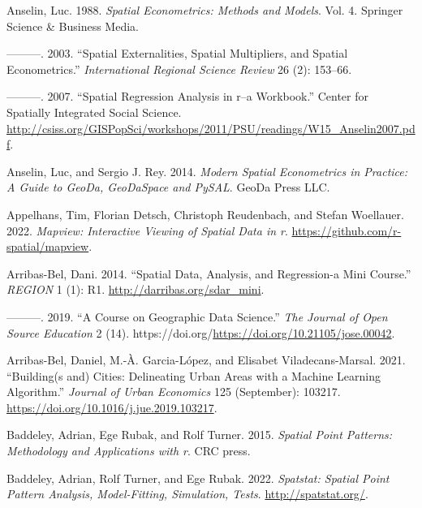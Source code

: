 \documentclass[
  letterpaper,
  DIV=11,
  numbers=noendperiod,
  oneside]{scrreprt}
\newlength{\cslhangindent}
\newenvironment{CSLReferences}[2] %
 {\begin{list}{}{%
  \setlength{\itemindent}{0pt}
  \setlength{\leftmargin}{0pt}
  \setlength{\parsep}{0pt}
  \ifodd #1
   \setlength{\leftmargin}{\cslhangindent}
   \setlength{\itemindent}{-1\cslhangindent}
  \fi
  \setlength{\itemsep}{#2\baselineskip}}}
 {\end{list}}
\begin{document}
\label{refs}
\begin{CSLReferences}{1}{0}
Anselin, Luc. 1988. \emph{Spatial Econometrics: Methods and Models}.
Vol. 4. Springer Science \& Business Media.

---------. 2003. {``Spatial Externalities, Spatial Multipliers, and
Spatial Econometrics.''} \emph{International Regional Science Review} 26
(2): 153--66.

---------. 2007. {``Spatial Regression Analysis in r--a Workbook.''}
Center for Spatially Integrated Social Science.
\url{http://csiss.org/GISPopSci/workshops/2011/PSU/readings/W15_Anselin2007.pdf}.

Anselin, Luc, and Sergio J. Rey. 2014. \emph{Modern Spatial Econometrics
in Practice: A Guide to GeoDa, GeoDaSpace and PySAL}. GeoDa Press LLC.

Appelhans, Tim, Florian Detsch, Christoph Reudenbach, and Stefan
Woellauer. 2022. \emph{Mapview: Interactive Viewing of Spatial Data in
r}. \url{https://github.com/r-spatial/mapview}.

Arribas-Bel, Dani. 2014. {``Spatial Data, Analysis, and Regression-a
Mini Course.''} \emph{REGION} 1 (1): R1.
\url{http://darribas.org/sdar_mini}.

---------. 2019. {``A Course on Geographic Data Science.''} \emph{The
Journal of Open Source Education} 2 (14).
https://doi.org/\url{https://doi.org/10.21105/jose.00042}.

Arribas-Bel, Daniel, M.-À. Garcia-López, and Elisabet Viladecans-Marsal.
2021. {``Building(s and) Cities: Delineating Urban Areas with a Machine
Learning Algorithm.''} \emph{Journal of Urban Economics} 125
(September): 103217. \url{https://doi.org/10.1016/j.jue.2019.103217}.

Baddeley, Adrian, Ege Rubak, and Rolf Turner. 2015. \emph{Spatial Point
Patterns: Methodology and Applications with r}. CRC press.

Baddeley, Adrian, Rolf Turner, and Ege Rubak. 2022. \emph{Spatstat:
Spatial Point Pattern Analysis, Model-Fitting, Simulation, Tests}.
\url{http://spatstat.org/}.


\end{CSLReferences}
\end{document}
